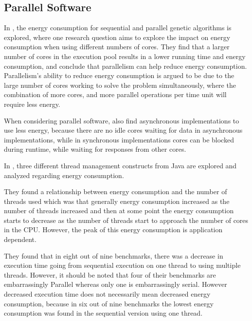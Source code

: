 \subsection{Parallel Software}

In \cite{abdelhafez2019}, the energy consumption for sequential and parallel genetic algorithms is explored, where one research question aims to explore the impact on energy consumption when using different numbers of cores. They find that a larger number of cores in the execution pool results in a lower running time and energy consumption, and conclude that parallelism can help reduce energy consumption. Parallelism's ability to reduce energy consumption is argued to be due to the large number of cores working to solve the problem simultaneously, where the combination of more cores, and more parallel operations per time unit will require less energy.

When considering parallel software, \cite{abdelhafez2019} also find asynchronous implementations to use less energy, because there are no idle cores waiting for data in asynchronous implementations, while in synchronous implementations cores can be blocked during runtime, while waiting for responses from other cores. 


In \cite{Pinto2014}, three different thread management constructs from Java are explored and analyzed regarding energy consumption.

They found a relationship between energy consumption and the number of threads used which was that generally energy consumption increased as the number of threads increased and then at some point the energy consumption starts to decrease as the number of threads start to approach the number of cores in the CPU. However, the peak of this energy consumption is application dependent.\cite{Pinto2014}

They found that in eight out of nine benchmarks, there was a decrease in execution time going from sequential execution on one thread to using multiple threads. However, it should be noted that four of their benchmarks are embarrassingly Parallel whereas only one is embarrassingly serial. However decreased execution time does not necessarily mean decreased energy consumption, because in six out of nine benchmarks the lowest energy consumption was found in the sequential version using one thread.\cite{Pinto2014}

